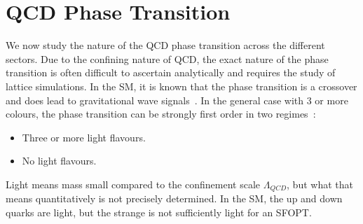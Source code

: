 \documentclass[nofootinbib,twocolumn,preprintnumbers]{revtex4-1}
\begin{document}
\section{QCD Phase Transition}
\label{sec:dQCD}
%

We now study the nature of the QCD phase transition across the different sectors. Due to the confining nature of QCD, the exact nature of the phase transition is often difficult to ascertain analytically and requires the study of lattice simulations. In the SM, it is known that the phase transition is a crossover and does lead to gravitational wave signals~\cite{Aoki:2006we,Bhattacharya:2014ara}. In the general case with 3 or more colours, the phase transition can be strongly first order in two regimes~\cite{Panero:2009tv,SVETITSKY1982423,Pisarski:1983ms}:
\begin{itemize}
\item Three or more light flavours.
\item No light flavours. 
\end{itemize}
Light means mass small compared to the confinement scale $\Lambda_{QCD}$, but what that means quantitatively is not precisely determined. In the SM, the up and down quarks are light, but the strange is not sufficiently light for an SFOPT.


%
\end{document}
